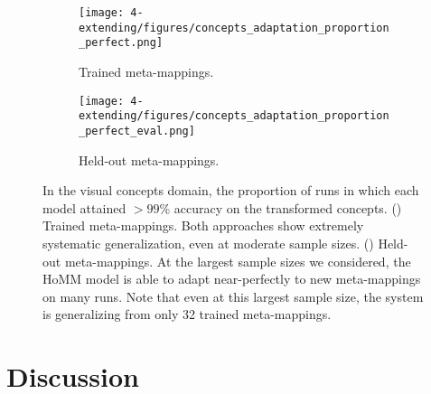 
\begin{figure}[t]
\begin{subfigure}{0.5\textwidth}
\texttt{[image: 4-extending/figures/concepts\_adaptation\_proportion\_perfect.png]}
\caption{Trained meta-mappings.}\label{fig:extending_concepts_perfect:train}
\end{subfigure}%
\begin{subfigure}{0.5\textwidth}
\texttt{[image: 4-extending/figures/concepts\_adaptation\_proportion\_perfect\_eval.png]}
\caption{Held-out meta-mappings.}\label{fig:extending_concepts_perfect:eval}
\end{subfigure}
\caption[In the visual concepts domain, the proportion of runs in which each model attained \(> 99\)\% accuracy on the transformed concepts.]{In the visual concepts domain, the proportion of runs in which each model attained \(> 99\)\% accuracy on the transformed concepts. () Trained meta-mappings. Both approaches show extremely systematic generalization, even at moderate sample sizes. () Held-out meta-mappings. At the largest sample sizes we considered, the HoMM model is able to adapt near-perfectly to new meta-mappings on many runs. Note that even at this largest sample size, the system is generalizing from only 32 trained meta-mappings.}\label{fig:extending_concepts_perfect}

\end{figure}



\section{Discussion}

